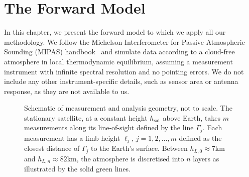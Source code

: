 \chapter{The Forward Model}
\label{ch:formodel}

In this chapter, we present the forward model to which we apply all our methodology. We follow the Michelson Interferometer for Passive Atmospheric Sounding (MIPAS) handbook~\cite{mipas2000handbook} and simulate data according to a cloud-free atmosphere in local thermodynamic equilibrium, assuming a measurement instrument with infinite spectral resolution and no pointing errors.
We do not include any other instrument-specific details, such as sensor area or antenna response, as they are not available to us. 
\begin{figure}[ht!]
	\centering
	
	\caption[Schematic of measurement and analysis geometry.]{Schematic of measurement and analysis geometry, not to scale.
		The stationary satellite, at a constant height $h_\text{sat}$ above Earth, takes $m$ measurements along its line-of-sight defined by the line $\Gamma_j$.
		Each measurement has a limb height $\ell_j$, $j=1,2,\dots,m$ defined as the closest distance of $\Gamma_j$ to the Earth's surface.
		Between $h_{L,0} \approx 7$km and $h_{L,n} \approx 82$km, the atmosphere is discretised into $n$ layers as illustrated by the solid green lines.}
	\label{fig:LIMB}
\end{figure}


